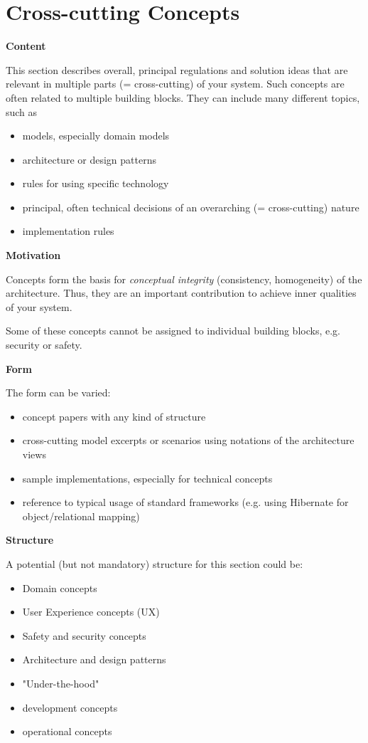 \hypertarget{section-concepts}{%
\section{Cross-cutting Concepts}\label{section-concepts}}

\textbf{Content}

This section describes overall, principal regulations and solution ideas
that are relevant in multiple parts (= cross-cutting) of your system.
Such concepts are often related to multiple building blocks. They can
include many different topics, such as

\begin{itemize}
\item
  models, especially domain models
\item
  architecture or design patterns
\item
  rules for using specific technology
\item
  principal, often technical decisions of an overarching (=
  cross-cutting) nature
\item
  implementation rules
\end{itemize}

\textbf{Motivation}

Concepts form the basis for \emph{conceptual integrity} (consistency,
homogeneity) of the architecture. Thus, they are an important
contribution to achieve inner qualities of your system.

Some of these concepts cannot be assigned to individual building blocks,
e.g. security or safety.

\textbf{Form}

The form can be varied:

\begin{itemize}
\item
  concept papers with any kind of structure
\item
  cross-cutting model excerpts or scenarios using notations of the
  architecture views
\item
  sample implementations, especially for technical concepts
\item
  reference to typical usage of standard frameworks (e.g. using
  Hibernate for object/relational mapping)
\end{itemize}

\textbf{Structure}

A potential (but not mandatory) structure for this section could be:

\begin{itemize}
\item
  Domain concepts
\item
  User Experience concepts (UX)
\item
  Safety and security concepts
\item
  Architecture and design patterns
\item
  "Under-the-hood"
\item
  development concepts
\item
  operational concepts
\end{itemize}

